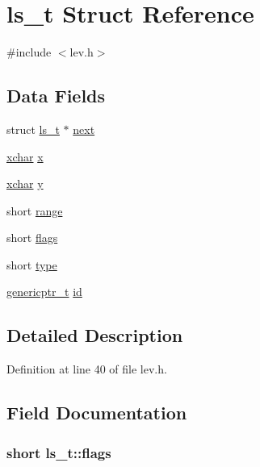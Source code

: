 \hypertarget{structls__t}{\section{ls\+\_\+t Struct Reference}
\label{structls__t}
}


{\ttfamily \#include $<$lev.\+h$>$}

\subsection*{Data Fields}
\begin{DoxyCompactItemize}
\item 
struct \hyperlink{structls__t}{ls\+\_\+t} $\ast$ \hyperlink{structls__t_ac52e34ae00c6269acc4d7ee640fa661f}{next}
\item 
\hyperlink{global_8h_a2043b7d01ce89f4ee2fa6c345a752d32}{xchar} \hyperlink{structls__t_a6c4a6a0d261a4e9ef251c62b6bc5ccd7}{x}
\item 
\hyperlink{global_8h_a2043b7d01ce89f4ee2fa6c345a752d32}{xchar} \hyperlink{structls__t_a7c15bf47a1426b8e59d0fbee6a09529d}{y}
\item 
short \hyperlink{structls__t_ac351f3076841b851b29b18fe28e28d2c}{range}
\item 
short \hyperlink{structls__t_a86fa9d3ab8893f2ff08cfa21844009b8}{flags}
\item 
short \hyperlink{structls__t_a1b364e93c6bf8f2d4331a7353803c5fe}{type}
\item 
\hyperlink{tradstdc_8h_ad4a7dab7269b4b00e3c7c7d2e66f31cd}{genericptr\+\_\+t} \hyperlink{structls__t_a753045829e6881cd06534586d0550eb0}{id}
\end{DoxyCompactItemize}


\subsection{Detailed Description}


Definition at line 40 of file lev.\+h.



\subsection{Field Documentation}
\hypertarget{structls__t_a86fa9d3ab8893f2ff08cfa21844009b8}{
\subsubsection[{flags}]{\setlength{\rightskip}{0pt plus 5cm}short ls\+\_\+t\+::flags}}\label{structls__t_a86fa9d3ab8893f2ff08cfa21844009b8}


